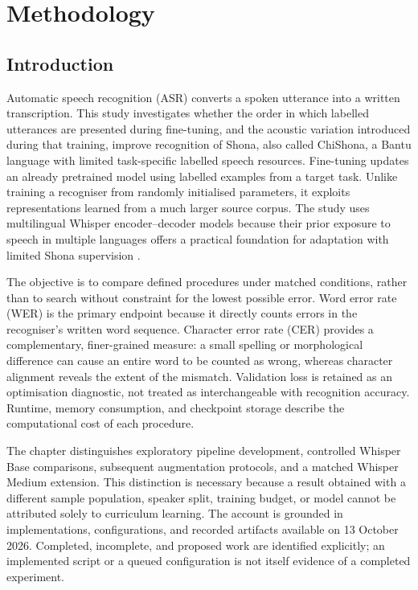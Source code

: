 \documentclass[12pt,a4paper]{report}
\begin{document}
\setcounter{chapter}{2}
\chapter{Methodology}
\label{chap:methodology}

\section{Introduction}

Automatic speech recognition (ASR) converts a spoken utterance into a written transcription. This study investigates whether the order in which labelled utterances are presented during fine-tuning, and the acoustic variation introduced during that training, improve recognition of Shona, also called ChiShona, a Bantu language with limited task-specific labelled speech resources. Fine-tuning updates an already pretrained model using labelled examples from a target task. Unlike training a recogniser from randomly initialised parameters, it exploits representations learned from a much larger source corpus. The study uses multilingual Whisper encoder--decoder models because their prior exposure to speech in multiple languages offers a practical foundation for adaptation with limited Shona supervision \citep{Radford2023}.

The objective is to compare defined procedures under matched conditions, rather than to search without constraint for the lowest possible error. Word error rate (WER) is the primary endpoint because it directly counts errors in the recogniser's written word sequence. Character error rate (CER) provides a complementary, finer-grained measure: a small spelling or morphological difference can cause an entire word to be counted as wrong, whereas character alignment reveals the extent of the mismatch. Validation loss is retained as an optimisation diagnostic, not treated as interchangeable with recognition accuracy. Runtime, memory consumption, and checkpoint storage describe the computational cost of each procedure.

The chapter distinguishes exploratory pipeline development, controlled Whisper Base comparisons, subsequent augmentation protocols, and a matched Whisper Medium extension. This distinction is necessary because a result obtained with a different sample population, speaker split, training budget, or model cannot be attributed solely to curriculum learning. The account is grounded in implementations, configurations, and recorded artifacts available on 13 October 2026. Completed, incomplete, and proposed work are identified explicitly; an implemented script or a queued configuration is not itself evidence of a completed experiment.
\end{document}
